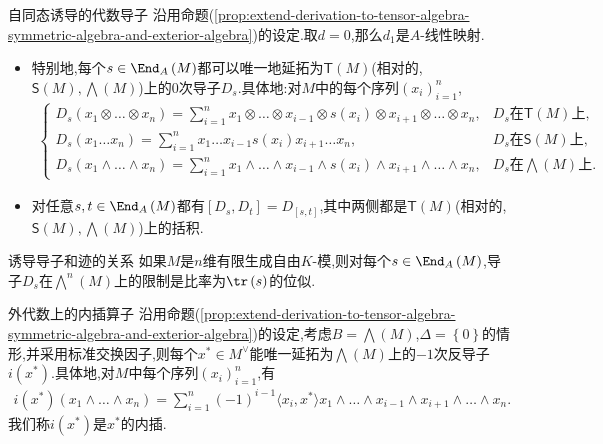 \begin{example}{自同态诱导的代数导子}{}
	沿用命题(\ref{prop:extend-derivation-to-tensor-algebra-symmetric-algebra-and-exterior-algebra})的设定.取$d=0$,那么$d_{1}$是$A$-线性映射.
	\begin{itemize}
		\item 特别地,每个$s\in\End_{A}\left(M\right)$都可以唯一地延拓为$\mathsf{T}\left(M\right)$(相对的,$\mathsf{S}\left(M\right),\bigwedge\left(M\right)$)上的$0$次导子$D_{s}$.具体地:对$M$中的每个序列$\left(x_{i}\right)_{i=1}^{n}$,
		\begin{align*}
			\begin{cases}
				D_{s}\left(x_{1}\otimes\ldots\otimes x_{n}\right)=\sum\limits_{i=1}^{n}x_{1}\otimes\ldots\otimes x_{i-1}\otimes s\left(x_{i}\right)\otimes x_{i+1}\otimes\ldots\otimes x_{n},&D_{s}\text{在}\mathsf{T}\left(M\right)\text{上},\\
				D_{s}\left(x_{1}\ldots x_{n}\right)=\sum\limits_{i=1}^{n}x_{1}\ldots x_{i-1}s\left(x_{i}\right)x_{i+1}\ldots x_{n},&D_{s}\text{在}\mathsf{S}\left(M\right)\text{上},\\
				D_{s}\left(x_{1}\wedge\ldots\wedge x_{n}\right)=\sum\limits_{i=1}^{n}x_{1}\wedge\ldots\wedge x_{i-1}\wedge s\left(x_{i}\right)\wedge x_{i+1}\wedge\ldots\wedge x_{n},&D_{s}\text{在}\bigwedge\left(M\right)\text{上}.
			\end{cases}
		\end{align*}
		\item 对任意$s,t\in\End_{A}\left(M\right)$都有$\left[D_{s},D_{t}\right]=D_{\left[s,t\right]}$,其中两侧都是$\mathsf{T}\left(M\right)$(相对的,$\mathsf{S}\left(M\right),\bigwedge\left(M\right)$)上的括积.
	\end{itemize}
\end{example}

\begin{proposition}{诱导导子和迹的关系}{}
	如果$M$是$n$维有限生成自由$K$-模,则对每个$s\in\End_{A}\left(M\right)$,导子$D_{s}$在$\bigwedge\limits^{n}\left(M\right)$上的限制是比率为$\tr\left(s\right)$的位似.
\end{proposition}

\begin{example}{外代数上的内插算子}{}
	沿用命题(\ref{prop:extend-derivation-to-tensor-algebra-symmetric-algebra-and-exterior-algebra})的设定,考虑$B=\bigwedge\left(M\right)$,$\Delta=\left\{0\right\}$的情形,并采用标准交换因子,则每个$x^{\ast}\in M^{\vee}$能唯一延拓为$\bigwedge\left(M\right)$上的$-1$次反导子$i\left(x^{\ast}\right)$.具体地,对$M$中每个序列$\left(x_{i}\right)_{i=1}^{n}$,有
	\begin{align*}
		i\left(x^{\ast}\right)\left(x_{1}\wedge\ldots\wedge x_{n}\right)=\sum\limits_{i=1}^{n}\left(-1\right)^{i-1}\langle x_{i},x^{\ast}\rangle x_{1}\wedge\ldots\wedge x_{i-1}\wedge x_{i+1}\wedge\ldots\wedge x_{n}.
	\end{align*}
	我们称$i\left(x^{\ast}\right)$是$x^{\ast}$的内插.
\end{example}

